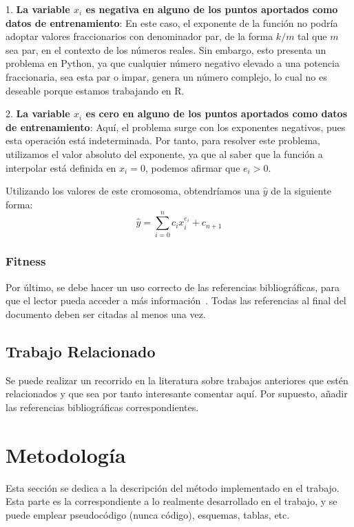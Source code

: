 \documentclass[conference,a4paper]{IEEEtran}
\begin{document}
1. \textbf{La variable \( x_i \) es negativa en alguno de los puntos aportados como datos de entrenamiento}: En este caso, el exponente de la función no podría adoptar valores fraccionarios con denominador par, de la forma \( k/m \) tal que \( m \) sea par, en el contexto de los números reales. Sin embargo, esto presenta un problema en Python, ya que cualquier número negativo elevado a una potencia fraccionaria, sea esta par o impar, genera un número complejo, lo cual no es deseable porque estamos trabajando en R.

2. \textbf{La variable \( x_i \) es cero en alguno de los puntos aportados como datos de entrenamiento}: Aquí, el problema surge con los exponentes negativos, pues esta operación está indeterminada. Por tanto, para resolver este problema, utilizamos el valor absoluto del exponente, ya que al saber que la función a interpolar está definida en \( x_i = 0 \), podemos afirmar que \( e_i > 0 \).

Utilizando los valores de este cromosoma, obtendríamos una \(\hat{y}\) de la siguiente forma:
\[
\hat{y} = \sum_{i=0}^{n} c_i x_i^{e_i} + c_{n+1}
\]




\subsubsection{Fitness}




Por último, se debe hacer un uso correcto de las referencias bibliográficas,
para que el lector pueda acceder a más información~\cite{b2}. Todas las
referencias al final del documento deben ser citadas al menos una vez.




\subsection{Trabajo Relacionado}

Se puede realizar un recorrido en la literatura sobre trabajos anteriores que
estén relacionados y que sea por tanto interesante comentar aquí. Por supuesto,
añadir las referencias bibliográficas correspondientes.


\section{Metodología}

Esta sección se dedica a la descripción del método implementado en el trabajo.
Esta parte es la correspondiente a lo realmente desarrollado en el trabajo, y
se puede emplear pseudocódigo (nunca código), esquemas, tablas, etc.
\end{document}
